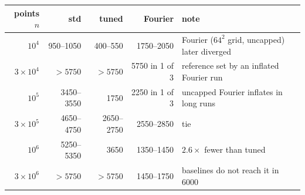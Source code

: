 \begin{tabular}{rrrrl}\toprule
points $n$ & std & tuned & Fourier & note\\\midrule
$10^4$ & 950--1050 & 400--550 & 1750--2050 & Fourier ($64^2$ grid, uncapped) later diverged\\
$3\times10^4$ & $>5750$ & $>5750$ & 5750 in 1 of 3 & reference set by an inflated Fourier run\\
$10^5$ & 3450--3550 & 1750 & 2250 in 1 of 3 & uncapped Fourier inflates in long runs\\
$3\times10^5$ & 4650--4750 & 2650--2750 & 2550--2850 & tie\\
$10^6$ & 5250--5350 & 3650 & 1350--1450 & $2.6\times$ fewer than tuned\\
$3\times10^6$ & $>5750$ & $>5750$ & 1450--1750 & baselines do not reach it in 6000\\
\bottomrule\end{tabular}
